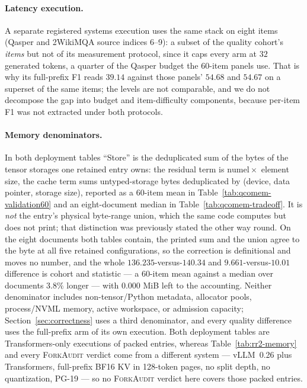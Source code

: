 \documentclass{article}
\newcommand{\method}{\textsc{ForkAudit}}
\begin{document}
\paragraph{Latency execution.}
A separate registered systems execution uses the same stack on eight items
(Qasper and 2WikiMQA source indices 6--9): a subset of the quality cohort's
\emph{items} but not of its measurement protocol, since it caps every arm at
$32$ generated tokens, a quarter of the Qasper budget the 60-item panels use.
That is why its full-prefix F1 reads $39.14$ against those panels' $54.68$ and
$54.67$ on a superset of the same items; the levels are not comparable, and we
do not decompose the gap into budget and item-difficulty components, because
per-item F1 was not extracted under both protocols.

\paragraph{Memory denominators.}
\label{sec:denominators}
In both deployment tables ``Store'' is the deduplicated sum of the bytes of the
tensor storages one retained entry owns: the residual term is
$\mathrm{numel}\times$ element size, the cache term sums untyped-storage bytes
deduplicated by (device, data pointer, storage size), reported as a 60-item mean
in Table~\ref{tab:qcomem-validation60} and an eight-document median in
Table~\ref{tab:qcomem-tradeoff}.  It is \emph{not} the entry's physical
byte-range union, which the same code computes but does not print; that
distinction was previously stated the other way round.  On the eight documents
both tables contain, the printed sum and the union agree to the byte at all five
retained configurations, so the correction is definitional and moves no number,
and the whole $136.235$-versus-$140.34$ and $9.661$-versus-$10.01$ difference is
cohort and statistic --- a 60-item mean against a median over documents $3.8\%$
longer --- with $0.000$ MiB left to the accounting.  Neither denominator includes
non-tensor/Python metadata, allocator pools, process/NVML memory, active
workspace, or admission capacity; Section~\ref{sec:correctness} uses a third
denominator, and every quality difference uses the full-prefix arm of its own
execution.  Both deployment tables are Transformers-only executions of packed
entries, whereas Table~\ref{tab:rr2-memory} and every \method{} verdict come from
a different system --- vLLM~0.26 plus Transformers, full-prefix BF16 KV in
128-token pages, no split depth, no quantization, PG-19 --- so no \method{}
verdict here covers those packed entries.
\end{document}
